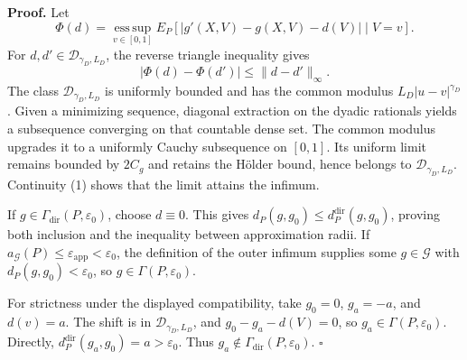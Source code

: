 \textbf{Proof.}
Let
\[
 \Phi(d)=\operatorname*{ess\,sup}_{v\in[0,1]}
 E_P[|g'(X,V)-g(X,V)-d(V)|\mid V=v].
\]
For \(d,d'\in\mathcal D_{\gamma_D,L_D}\), the reverse triangle inequality gives
\[
 |\Phi(d)-\Phi(d')|\le\|d-d'\|_\infty. \tag{1}
\]
The class \(\mathcal D_{\gamma_D,L_D}\) is uniformly bounded and has the common modulus \(L_D|u-v|^{\gamma_D}\). Given a minimizing sequence, diagonal extraction on the dyadic rationals yields a subsequence converging on that countable dense set. The common modulus upgrades it to a uniformly Cauchy subsequence on \([0,1]\). Its uniform limit remains bounded by \(2C_g\) and retains the H\"older bound, hence belongs to \(\mathcal D_{\gamma_D,L_D}\). Continuity (1) shows that the limit attains the infimum.

If \(g\in\Gamma_{\mathrm{dir}}(P,\varepsilon_0)\), choose \(d\equiv0\). This gives \(d_P(g,g_0)\le d_P^{\mathrm{dir}}(g,g_0)\), proving both inclusion and the inequality between approximation radii. If \(a_{\mathcal G}(P)\le\varepsilon_{\mathrm{app}}<\varepsilon_0\), the definition of the outer infimum supplies some \(g\in\mathcal G\) with \(d_P(g,g_0)<\varepsilon_0\), so \(g\in\Gamma(P,\varepsilon_0)\).

For strictness under the displayed compatibility, take \(g_0=0\), \(g_a=-a\), and \(d(v)=a\). The shift is in \(\mathcal D_{\gamma_D,L_D}\), and \(g_0-g_a-d(V)=0\), so \(g_a\in\Gamma(P,\varepsilon_0)\). Directly, \(d_P^{\mathrm{dir}}(g_a,g_0)=a>\varepsilon_0\). Thus \(g_a\notin\Gamma_{\mathrm{dir}}(P,\varepsilon_0)\). \(\square\)